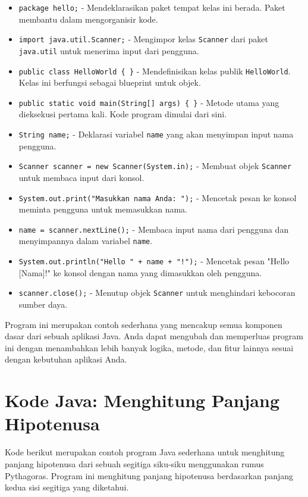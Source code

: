 \begin{itemize}
\item \texttt{package hello;} - Mendeklarasikan paket tempat kelas ini berada. Paket membantu dalam mengorganisir kode.
\item \texttt{import java.util.Scanner;} - Mengimpor kelas \texttt{Scanner} dari paket \texttt{java.util} untuk menerima input dari pengguna.
\item \texttt{public class HelloWorld \{ \}} - Mendefinisikan kelas publik \texttt{HelloWorld}. Kelas ini berfungsi sebagai blueprint untuk objek.
\item \texttt{public static void main(String[] args) \{ \}} - Metode utama yang dieksekusi pertama kali. Kode program dimulai dari sini.
\item \texttt{String name;} - Deklarasi variabel \texttt{name} yang akan menyimpan input nama pengguna.
\item \texttt{Scanner scanner = new Scanner(System.in);} - Membuat objek \texttt{Scanner} untuk membaca input dari konsol.
\item \texttt{System.out.print("Masukkan nama Anda: ");} - Mencetak pesan ke konsol meminta pengguna untuk memasukkan nama.
\item \texttt{name = scanner.nextLine();} - Membaca input nama dari pengguna dan menyimpannya dalam variabel \texttt{name}.
\item \texttt{System.out.println("Hello " + name + "!");} - Mencetak pesan "Hello [Nama]!" ke konsol dengan nama yang dimasukkan oleh pengguna.
\item \texttt{scanner.close();} - Menutup objek \texttt{Scanner} untuk menghindari kebocoran sumber daya.
\end{itemize}

Program ini merupakan contoh sederhana yang mencakup semua komponen dasar dari sebuah aplikasi Java. Anda dapat mengubah dan memperluas program ini dengan menambahkan lebih banyak logika, metode, dan fitur lainnya sesuai dengan kebutuhan aplikasi Anda.

\section{Kode Java: Menghitung Panjang Hipotenusa}

Kode berikut merupakan contoh program Java sederhana untuk menghitung panjang hipotenusa dari sebuah segitiga siku-siku menggunakan rumus Pythagoras. Program ini menghitung panjang hipotenusa berdasarkan panjang kedua sisi segitiga yang diketahui.

